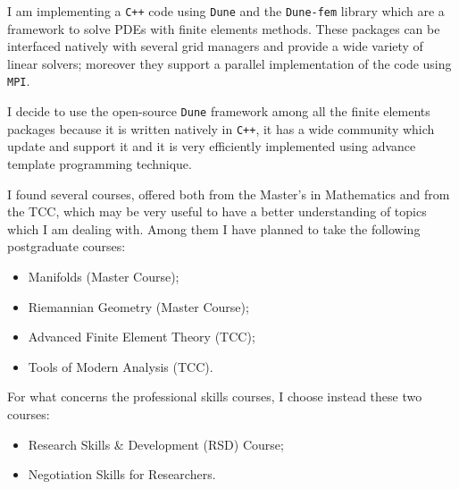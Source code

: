 \documentclass[a4paper,12pt]{report}
\begin{document}
I am implementing a \verb|C++| code using \verb|Dune| and the \verb|Dune-fem|
library which are a framework to solve PDEs with finite elements methods. These
packages can be interfaced natively with several grid managers and provide a
wide variety of linear solvers; moreover they support a parallel implementation
of the code using \verb|MPI|.

I decide to use the open-source \verb|Dune| framework among all the finite
elements packages because it is written natively in \verb|C++|, it has a wide
community which update and support it and it is very efficiently implemented
using advance template programming technique.
\newline

I found several courses, offered both from the Master's in Mathematics and from
the TCC, which may be very useful to have a better understanding of topics which
I am dealing with. Among them I have planned to take the following postgraduate
courses:
\begin{itemize}
\item Manifolds (Master Course);
\item Riemannian Geometry (Master Course);
\item Advanced Finite Element Theory (TCC);
\item Tools of Modern Analysis (TCC).
\end{itemize}

For what concerns the professional skills courses, I choose instead these two
courses:
\begin{itemize}
\item Research Skills \& Development (RSD) Course;
\item Negotiation Skills for Researchers.
\end{itemize}
\end{document}
